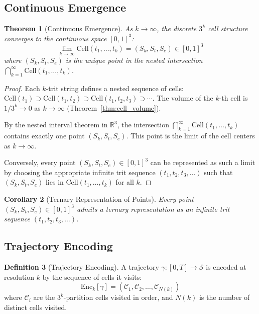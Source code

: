 \documentclass[11pt,twocolumn,a4paper]{article}
\newtheorem{theorem}{Theorem}[section]
\newtheorem{corollary}[theorem]{Corollary}
\theoremstyle{definition}
\newtheorem{definition}[theorem]{Definition}
\theoremstyle{remark}
\newcommand{\RR}{\mathbb{R}}
\newcommand{\Sspace}{\mathcal{S}}
\newcommand{\Scoord}{(\Sk,\St,\Se)}
\newcommand{\Sk}{S_k}
\newcommand{\St}{S_t}
\newcommand{\Se}{S_e}
\begin{document}
\subsection{Continuous Emergence}

\begin{theorem}[Continuous Emergence]
\label{thm:continuous_emergence}
As $k \to \infty$, the discrete $3^k$ cell structure converges to the continuous space $[0,1]^3$:
\begin{equation}
\lim_{k \to \infty} \text{Cell}(t_1,\ldots,t_k) = \Scoord \in [0,1]^3
\label{eq:continuous_emergence}
\end{equation}
where $\Scoord$ is the unique point in the nested intersection $\bigcap_{k=1}^\infty \text{Cell}(t_1,\ldots,t_k)$.
\end{theorem}

\begin{proof}
Each $k$-trit string defines a nested sequence of cells: $\text{Cell}(t_1) \supset \text{Cell}(t_1,t_2) \supset \text{Cell}(t_1,t_2,t_3) \supset \cdots$. The volume of the $k$-th cell is $1/3^k \to 0$ as $k \to \infty$ (Theorem~\ref{thm:cell_volume}).

By the nested interval theorem in $\RR^3$, the intersection $\bigcap_{k=1}^\infty \text{Cell}(t_1,\ldots,t_k)$ contains exactly one point $\Scoord$. This point is the limit of the cell centers as $k \to \infty$.

Conversely, every point $\Scoord \in [0,1]^3$ can be represented as such a limit by choosing the appropriate infinite trit sequence $(t_1,t_2,t_3,\ldots)$ such that $\Scoord$ lies in $\text{Cell}(t_1,\ldots,t_k)$ for all $k$.
\end{proof}

\begin{corollary}[Ternary Representation of Points]
\label{cor:ternary_representation}
Every point $\Scoord \in [0,1]^3$ admits a ternary representation as an infinite trit sequence $(t_1,t_2,t_3,\ldots)$.
\end{corollary}

\subsection{Trajectory Encoding}

\begin{definition}[Trajectory Encoding]
\label{def:trajectory_encoding}
A trajectory $\gamma: [0,T] \to \Sspace$ is encoded at resolution $k$ by the sequence of cells it visits:
\begin{equation}
\text{Enc}_k[\gamma] = \left(\mathcal{C}_1, \mathcal{C}_2, \ldots, \mathcal{C}_{N(k)}\right)
\label{eq:trajectory_encoding}
\end{equation}
where $\mathcal{C}_i$ are the $3^k$-partition cells visited in order, and $N(k)$ is the number of distinct cells visited.
\end{definition}
\end{document}
